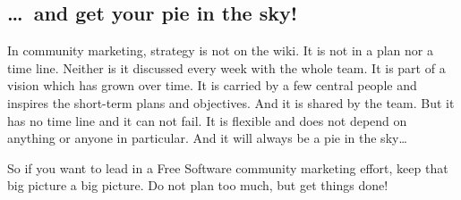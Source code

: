 \subsection*{\dots\ and get your pie in the sky!}
In community marketing, strategy is not on the wiki. It is not in a plan nor a
time line. Neither is it discussed every week with the whole team. It is part of
a vision which has grown over time. It is carried by a few central people and
inspires the short-term plans and objectives. And it is shared by the team. But
it has no time line and it can not fail. It is flexible and does not depend on
anything or anyone in particular. And it will always be a pie in the sky\dots

So if you want to lead in a Free Software community marketing effort, keep that
big picture a big picture. Do not plan too much, but get things done!
